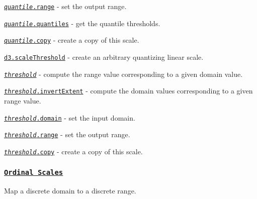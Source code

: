 \begin{DoxyItemize}
\item \href{https://github.com/d3/d3-scale/blob/master/README.md#quantile_range}{\tt {\itshape quantile}.range} -\/ set the output range.
\item \href{https://github.com/d3/d3-scale/blob/master/README.md#quantile_quantiles}{\tt {\itshape quantile}.quantiles} -\/ get the quantile thresholds.
\item \href{https://github.com/d3/d3-scale/blob/master/README.md#quantile_copy}{\tt {\itshape quantile}.copy} -\/ create a copy of this scale.
\item \href{https://github.com/d3/d3-scale/blob/master/README.md#scaleThreshold}{\tt d3.\+scale\+Threshold} -\/ create an arbitrary quantizing linear scale.
\item \href{https://github.com/d3/d3-scale/blob/master/README.md#_threshold}{\tt {\itshape threshold}} -\/ compute the range value corresponding to a given domain value.
\item \href{https://github.com/d3/d3-scale/blob/master/README.md#threshold_invertExtent}{\tt {\itshape threshold}.invert\+Extent} -\/ compute the domain values corresponding to a given range value.
\item \href{https://github.com/d3/d3-scale/blob/master/README.md#threshold_domain}{\tt {\itshape threshold}.domain} -\/ set the input domain.
\item \href{https://github.com/d3/d3-scale/blob/master/README.md#threshold_range}{\tt {\itshape threshold}.range} -\/ set the output range.
\item \href{https://github.com/d3/d3-scale/blob/master/README.md#threshold_copy}{\tt {\itshape threshold}.copy} -\/ create a copy of this scale.
\end{DoxyItemize}

\subsubsection*{\href{https://github.com/d3/d3-scale/blob/master/README.md#ordinal-scales}{\tt Ordinal Scales}}

Map a discrete domain to a discrete range.


